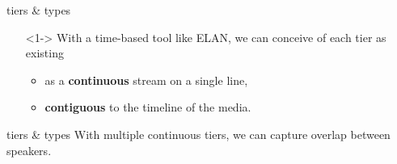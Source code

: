 \documentclass{beamer}
\begin{document}
    \begin{frame}{tiers \& types}
      \begin{enumerate}
        \item[]<1-> With a time-based tool like ELAN, we can conceive of each tier as existing 
          \begin{itemize}
            \item<2-> as a \textbf{continuous} stream on a single line, 
            \item<2-> \textbf{contiguous} to the timeline of the media.
          \end{itemize}
      \end{enumerate}
    \end{frame}
    
    \begin{frame}{tiers \& types}
With multiple continuous tiers, we can capture overlap between speakers.
    \end{frame}
    
\end{document}

